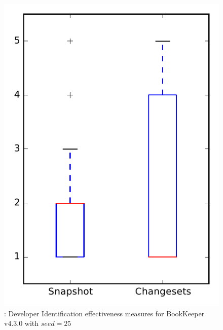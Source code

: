 
\begin{figure}
\centering
\includegraphics[height=0.4\textheight]{figures/dit_seed/rq1_bookkeeper_25}
\caption{\rtwo: Developer Identification effectiveness measures for BookKeeper v4.3.0 with $seed=25$}
\label{fig:dit_seed:rq1:bookkeeper}
\end{figure}
